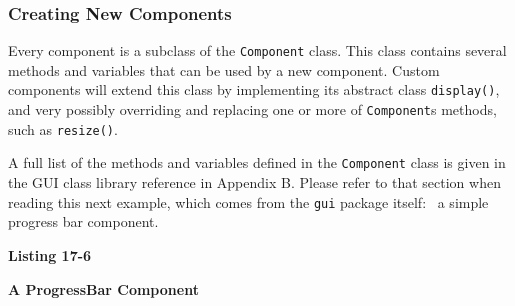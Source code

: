 \subsubsection{Creating New Components}

Every component is a subclass of the \texttt{Component}
class. This class contains several methods and variables that can be
used by a new component. Custom components will extend this class by
implementing its abstract class \texttt{display()}, and very possibly
overriding and replacing one or more of
\texttt{Component}{\textquotesingle}s methods, such as
\texttt{resize()}.

A full list of the methods and variables defined in the
\texttt{Component} class is given in the GUI class library reference in
Appendix B. Please refer to that section when reading this next
example, which comes from the \texttt{gui} package itself: \ a simple
{\textquotedbl}progress bar{\textquotedbl} component.

{\sffamily\bfseries
Listing 17-6}

{\sffamily\bfseries
A ProgressBar Component}

